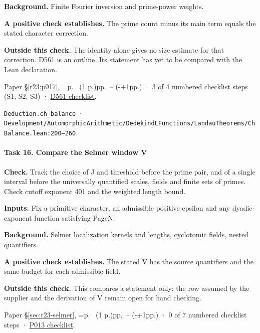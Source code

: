 \textbf{Background.} Finite Fourier inversion and prime-power weights.

\textbf{A positive check establishes.} The prime count minus its main term equals the stated character correction.

\textbf{Outside this check.} The identity alone gives no size estimate for that correction. D561 is an outline. Its statement has yet to be compared with the Lean declaration.

Paper \S\ref{r23:p017}, \ifnum{}=\relax p.\ \pageref{r24:balance} (1 p.)\else pp.\ \pageref{r24:balance}--\pageref{v5:balance-end} (\number\numexpr{}-+1\relax pp.)\fi{} · 3 of 4 numbered checklist steps (S1, S2, S3) · \href{https://github.com/GunheeC/rh-lean-verification-atlas/blob/v0.1.0/units/D561.check.md}{D561 checklist}.

\nolinkurl{Deduction.ch_balance} · \nolinkurl{Development/AutomorphicArithmetic/DedekindLFunctions/LandauTheorems/ChBalance.lean:200–260}.

\paragraph{Task 16. Compare the Selmer window V}\label{v7:task-16}

\textbf{Check.} Track the choice of J and threshold before the prime pair, and of a single interval before the universally quantified scales, fields and finite sets of primes. Check cutoff exponent 401 and the weighted length bound.

\textbf{Inputs.} Fix a primitive character, an admissible positive epsilon and any dyadic-exponent function satisfying PageN.

\textbf{Background.} Selmer localization kernels and lengths, cyclotomic fields, nested quantifiers.

\textbf{A positive check establishes.} The stated V has the source quantifiers and the same budget for each admissible field.

\textbf{Outside this check.} This compares a statement only; the row assumed by the supplier and the derivation of V remain open for hand checking.

Paper \S\ref{sec:r23-selmer}, \ifnum{}=\relax p.\ \pageref{sec:r23-selmer} (1 p.)\else pp.\ \pageref{sec:r23-selmer}--\pageref{sec:r23-p012} (\number\numexpr{}-+1\relax pp.)\fi{} · 0 of 7 numbered checklist steps · \href{https://github.com/GunheeC/rh-lean-verification-atlas/blob/v0.1.0/units/P013.check.md}{P013 checklist}.

